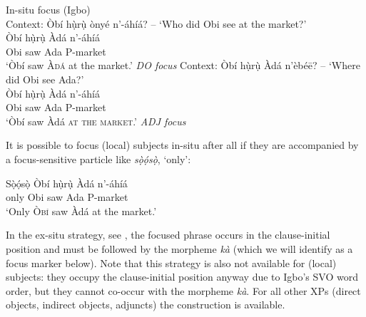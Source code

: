 \documentclass[output=paper,colorlinks,citecolor=brown]{langscibook}
\begin{document}
\ea%
    \label{ex:amaechi:3}
    In-situ focus (Igbo)\\
    \ea\label{ex:amaechi:3a}
    Context: Òbí hụ̀rụ̀ ònyé n'-áhíá? -- `Who did Obi see at the market?'\\
    \gll    Òbí hụ̀rụ̀ Àdá n'-áhíá\\
            Obi saw Ada P-market\\
    \glt    `Òbí saw \textsc{Àdá} at the market.' \hfill\textit{\small DO focus}
    \ex\label{ex:amaechi:3b}
    Context: Òbí hụ̀rụ̀ Àdá n'èbé\=e? -- `Where did Obi see Ada?'\\
    \gll    Òbí hụ̀rụ̀ Àdá n'-áhíá\\
            Obi saw Ada P-market\\
    \glt    `Òbí saw Àdá \textsc{at the market}.' \hfill\textit{\small ADJ focus}
    \z
\z

It is possible to focus (local) subjects in-situ after all if they are accompanied by a focus-sensitive particle like \textit{sọ̀ọ́sọ̀}, `only':

\ea%
    \label{ex:amaechi:4}
    \gll    Sọ̀ọ́sọ̀ Òbí hụ̀rụ̀ Àdá n'-áhíá\\
            only Obi saw Ada P-market\\
    \glt    `Only \textsc{Òbí} saw Àdá at the market.'
\z

In the ex-situ strategy, see , the focused phrase occurs in the clause-initial position and must be followed by the morpheme \textit{k\`a} (which we will identify as a focus marker below). Note that this strategy is also not available for (local) subjects: they occupy the clause-initial position anyway due to Igbo's  SVO word order, but they cannot co-occur with the morpheme \textit{k\`a}. For all other XPs (direct objects, indirect objects, adjuncts) the construction is available.
\end{document}
